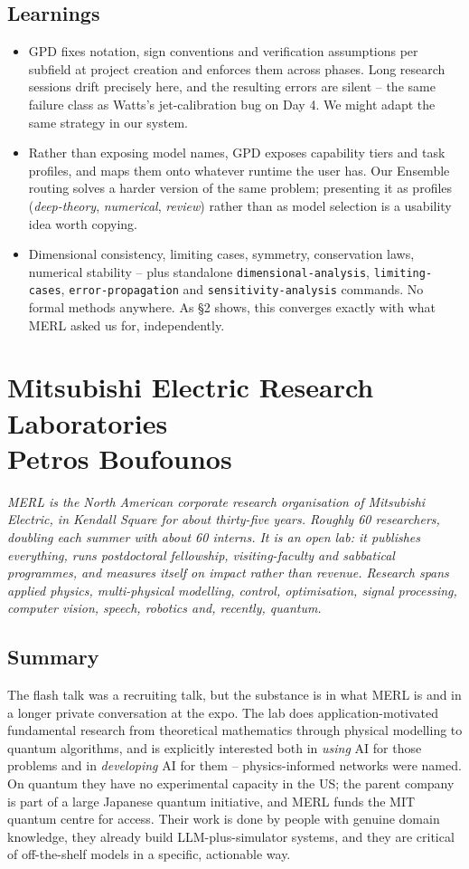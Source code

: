 \documentclass[11pt]{article}
\begin{document}
\subsection*{Learnings}
\begin{itemize}
    \item GPD fixes notation, sign conventions and verification assumptions per subfield at project creation and enforces them across phases. Long research sessions drift precisely here, and the resulting errors are silent -- the same failure class as Watts's jet-calibration bug on Day 4. We might adapt the same strategy in our system.
    \item Rather than exposing model names, GPD exposes capability tiers and task profiles, and maps them onto whatever runtime the user has. Our Ensemble routing solves a harder version of the same problem; presenting it as profiles (\emph{deep-theory}, \emph{numerical}, \emph{review}) rather than as model selection is a usability idea worth copying.
    \item Dimensional consistency, limiting cases, symmetry, conservation laws, numerical stability -- plus standalone \texttt{dimensional-analysis}, \texttt{limiting-cases}, \texttt{error-propagation} and \texttt{sensitivity-analysis} commands. No formal methods anywhere. As \S2 shows, this converges exactly with what MERL asked us for, independently.
\end{itemize}

\section{Mitsubishi Electric Research Laboratories\\
{\large Petros Boufounos}}

\emph{MERL is the North American corporate research organisation of Mitsubishi Electric, in Kendall Square for about thirty-five years. Roughly 60 researchers, doubling each summer with about 60 interns. It is an open lab: it publishes everything, runs postdoctoral fellowship, visiting-faculty and sabbatical programmes, and measures itself on impact rather than revenue. Research spans applied physics, multi-physical modelling, control, optimisation, signal processing, computer vision, speech, robotics and, recently, quantum.}

\subsection*{Summary}
The flash talk was a recruiting talk, but the substance is in what MERL is and in a longer private conversation at the expo. The lab does application-motivated fundamental research from theoretical mathematics through physical modelling to quantum algorithms, and is explicitly interested both in \emph{using} AI for those problems and in \emph{developing} AI for them -- physics-informed networks were named. On quantum they have no experimental capacity in the US; the parent company is part of a large Japanese quantum initiative, and MERL funds the MIT quantum centre for access. Their work is done by people with genuine domain knowledge, they already build LLM-plus-simulator systems, and they are critical of off-the-shelf models in a specific, actionable way.
\end{document}
